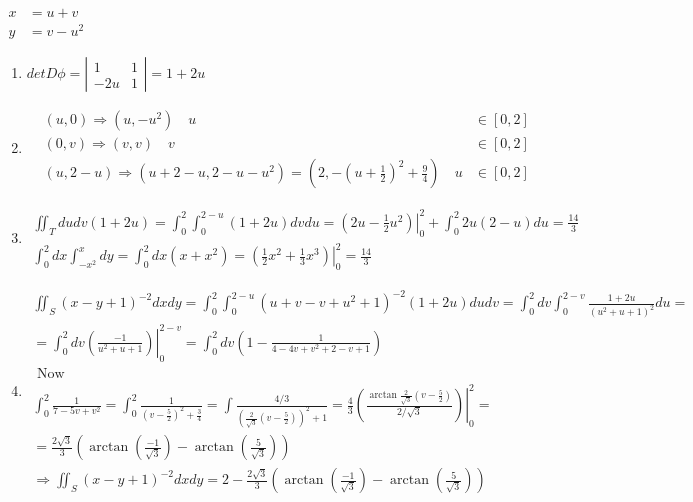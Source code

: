 \documentclass[twoside]{amsart}
\theoremstyle{plain}
\theoremstyle{definition}
\newcommand{\exercisehead}[1]
  {
   \noindent{\small\bf Exercise #1.}
   \smallskip}
\begin{document}
\exercisehead{17} $\begin{aligned} x & = u + v \\ y & = v - u^2 \end{aligned}$ 
\begin{enumerate}
  \item $det{ D \phi} = \left| \begin{matrix} 1 & 1 \\ -2u & 1 \end{matrix} \right| = 1 + 2u$
  \item \[ 
    \begin{aligned}
      & (u,0) \Longrightarrow (u , -u^2) \quad  u & \in [0,2] \\ 
      & (0,v) \Longrightarrow (v,v) \quad v & \in [0,2] \\ 
      & (u,2-u) \Longrightarrow (u + 2 -u, 2 - u -u^2) = (2, -(u+\frac{1}{2})^2 + \frac{9}{4}) \quad u & \in [0,2] 
\end{aligned} \]
  \item \[
\begin{gathered}
  \iint_T du dv (1+ 2u) = \int_0^2 \int_0^{2-u} (1+2u) dv du = \left. (2u - \frac{1}{2} u^2 ) \right|_0^2 + \int_0^2 2u (2-u) du = \frac{14}{3} \\ 
  \int_0^2 dx \int_{-x^2}^x dy = \int_0^2 dx ( x+x^2) = \left. \left( \frac{1}{2} x^2 + \frac{1}{3} x^3  \right) \right|_0^2 = \frac{14}{3}
\end{gathered}
\]
  \item \[
\begin{gathered}
  \iint_S (x-y+1)^{-2} dx dy = \int_0^2 \int_0^{2-u} (u+v -v + u^2 + 1 )^{-2} (1+2u) du dv = \int_0^2 dv \int_0^{2-v} \frac{1+ 2u}{ (u^2 + u +1)^2} du = \\
  = \int_0^2 dv \left. \left( \frac{-1}{ u^2 + u + 1 } \right) \right|_0^{2-v}   = \int_0^2 dv \left( 1 - \frac{1}{ 4 - 4v + v^2 + 2 -v + 1 } \right) \\ 
  \text{ Now } \\
  \int_0^2 \frac{ 1}{ 7 - 5v + v^2}  = \int_0^2 \frac{1}{ (v- \frac{5}{2} )^2 + \frac{3}{4} } = \int \frac{4/3}{ \left( \frac{2}{\sqrt{3}} (v-\frac{5}{2}) \right)^2 + 1  } = \left. \frac{ 4}{3} \left( \frac{ \arctan{ \frac{2}{\sqrt{3}} (v-\frac{5}{2} ) } }{ 2 /\sqrt{3}} \right) \right|_0^2 = \\
  = \frac{2\sqrt{3}}{3} \left( \arctan{ \left( \frac{-1}{\sqrt{3}} \right) } - \arctan{ \left( \frac{5}{\sqrt{3}} \right) } \right) \\
  \Longrightarrow \iint_S (x-y+1)^{-2} dx dy = 2 - \frac{2 \sqrt{3}}{3} \left( \arctan{ \left( \frac{-1}{\sqrt{3}} \right) } - \arctan{ \left( \frac{5}{\sqrt{3} } \right) } \right)
\end{gathered}
\]
\end{enumerate}
\end{document}
